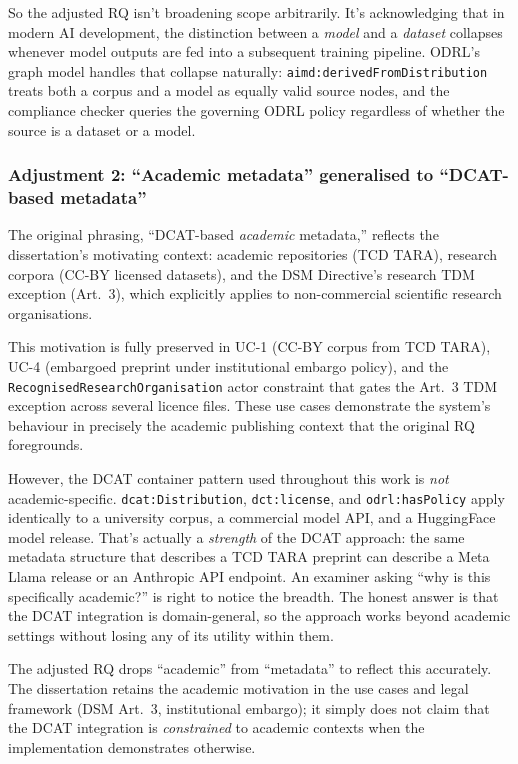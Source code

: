 \documentclass[12pt,a4paper]{article}
\begin{document}
So the adjusted RQ isn't broadening scope arbitrarily. It's acknowledging that in modern AI development, the distinction between a \emph{model} and a \emph{dataset} collapses whenever model outputs are fed into a subsequent training pipeline. ODRL's graph model handles that collapse naturally: \texttt{aimd:derivedFromDistribution} treats both a corpus and a model as equally valid source nodes, and the compliance checker queries the governing ODRL policy regardless of whether the source is a dataset or a model.

\subsubsection*{Adjustment 2: ``Academic metadata'' generalised to ``DCAT-based metadata''}

The original phrasing, ``DCAT-based \emph{academic} metadata,'' reflects the dissertation's motivating context: academic repositories (TCD TARA), research corpora (CC-BY licensed datasets), and the DSM Directive's research TDM exception (Art.\ 3), which explicitly applies to non-commercial scientific research organisations.

This motivation is fully preserved in UC-1 (CC-BY corpus from TCD TARA), UC-4 (embargoed preprint under institutional embargo policy), and the \texttt{RecognisedResearchOrganisation} actor constraint that gates the Art.\ 3 TDM exception across several licence files. These use cases demonstrate the system's behaviour in precisely the academic publishing context that the original RQ foregrounds.

However, the DCAT container pattern used throughout this work is \emph{not} academic-specific. \texttt{dcat:Distribution}, \texttt{dct:license}, and \texttt{odrl:hasPolicy} apply identically to a university corpus, a commercial model API, and a HuggingFace model release. That's actually a \emph{strength} of the DCAT approach: the same metadata structure that describes a TCD TARA preprint can describe a Meta Llama release or an Anthropic API endpoint. An examiner asking ``why is this specifically academic?'' is right to notice the breadth. The honest answer is that the DCAT integration is domain-general, so the approach works beyond academic settings without losing any of its utility within them.

The adjusted RQ drops ``academic'' from ``metadata'' to reflect this accurately. The dissertation retains the academic motivation in the use cases and legal framework (DSM Art.\ 3, institutional embargo); it simply does not claim that the DCAT integration is \emph{constrained} to academic contexts when the implementation demonstrates otherwise.
\end{document}
